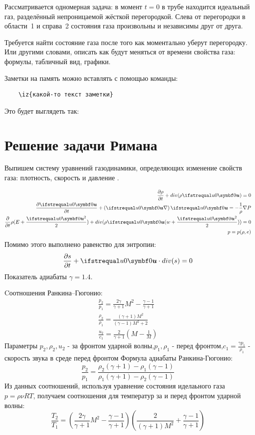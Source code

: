 \documentclass[a4paper,12pt]{extarticle}
\begin{document}
Рассматривается одномерная задача: 
в момент $t=0$ в трубе находится идеальный газ, разделённый  непроницаемой жёсткой перегородкой. 
Слева от перегородки в области~1 и  справа~2 состояния газа произвольны и независимы друг от друга. 


Требуется найти состояние газа после того как моментально уберут перегородку. 
Или другими словами, описать как будут меняться от времени свойства газа: формулы, табличный вид, графики. 

Заметки на память можно вставлять с помощью команды:
\begin{verbatim}
	\iz{какой-то текст заметки}
\end{verbatim}
 
Это будет выглядеть так: 	

\section{Решение задачи Римана}

Выпишем систему уравнений газодинамики, определяющих изменение свойств газа: плотность, скорость и давление \cite{zr1968}.

\begin{align} 
	\frac{\partial \rho}{\partial t} + div(\rho \vecxu) = 0 \label{eq:continuity}\\
	\frac{\partial  \vecxu}{\partial t} + \left(\vecxu \nabla \right)\vecxu = -\frac{1}{\rho}\nabla P  \label{eq:euler}	\\
	\frac{\partial }{\partial t}\rho(E+\frac{\vecxu^2}{2}) + div(\rho \vecxu (w+\frac{\vecxu^2}{2})) = 0  \label{eq:energy} \\
        p = p(\rho,e)
\end{align}
Помимо этого выполнено равенство для энтропии:
        $$ \frac{\partial s}{\partial t} + \vecxu \cdot div(s) = 0 \label{eq:entropy} $$
Показатель адиабаты $\gamma = 1.4$.

Cоотношения Ранкина--Гюгонио:
    \begin{align} 
    \frac{p_2}{p_1} = \frac{2\gamma}{\gamma+1}M^2-\frac{\gamma-1}{\gamma+1} \\
    \frac{\rho_2}{\rho_1} = \frac{(\gamma+1)M^2}{(\gamma-1)M^2+2} \\
    \frac{u_2}{c_1} = \frac{2}{\gamma+1}(M-\frac{1}{M})
    \end{align}
     Параметры $ p_2, \rho_2, u_2 $ - за фронтом ударной волны,$ p_1, \rho_1$ - перед фронтом,$ c_1 =  \frac{\gamma p_1}{\rho_1}$ - скорость звука в среде перед фронтом 
     Формула адиабаты Ранкина-Гюгонио:
     $$\frac{p_2}{p_1}=\frac{\rho_2(\gamma+1)-\rho_1(\gamma-1)}{\rho_1(\gamma+1)-\rho_2(\gamma-1)}$$
     Из данных соотношений, используя уравнение состояния иделаьного газа $p = \rho \nu RT$, получаем соотношения для температур за и перед фронтом ударной волны: 
     $$\frac{T_2}{T_1} = (\frac{2\gamma }{\gamma+1}M^2-\frac{\gamma-1}{\gamma+1})(\frac{2}{(\gamma+1)M^2}+\frac{\gamma-1}{\gamma+1})$$
    
\end{document}
